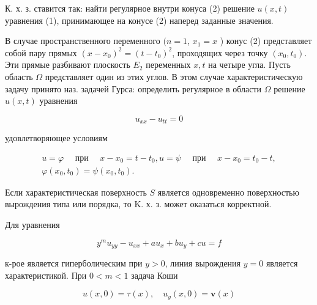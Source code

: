 \documentclass[10pt]{article}
\begin{document}
К. х. з. ставится так: найти регулярное внутри конуса (2) решение $u(x, t)$ уравнения (1), принимающее на конусе (2) наперед заданные значения.



В случае пространственного переменного $(n=1$, $x_{1}=x$ ) конус (2) представляет собой пару прямых $\left(x-x_{0}\right)^{2}=\left(t-t_{0}\right)^{2}$, проходящих через точку $\left(x_{0}, t_{0}\right)$. Эти прямые разбивают плоскость $E_{2}$ переменных $x, t$ на четыре угла. Пусть область $\Omega$ представляет один из этих углов. В этом случае характеристическую задачу принято наз. задачей Гурса: определить регулярное в области $\Omega$ решение $u(x, t)$ уравнения



\[

u_{x x}-u_{t t}=0

\]



удовлетворяющее условиям



\[

\begin{gathered}

u=\varphi \quad \text { при } \quad x-x_{0}=t-t_{0}, u=\psi \quad \text { при } \quad x-x_{0}=t_{0}-t, \\

\varphi\left(x_{0}, t_{0}\right)=\psi\left(x_{0}, t_{0}\right) .

\end{gathered}

\]



Если характеристическая поверхность $S$ является одновременно поверхностью вырождения типа или порядка, то K. х. з. может оказаться корректной.



Для уравнения



\[

y^{m} u_{y y}-u_{x x}+a u_{x}+b u_{y}+c u=f

\]



к-рое является гиперболическим при $y>0$, линия вырождения $y=0$ является характеристикой. При $0<m<1$ задача Коши



\[

u(x, 0)=\tau(x), \quad u_{y}(x, 0)=\boldsymbol{v}(x)

\]
\end{document}
